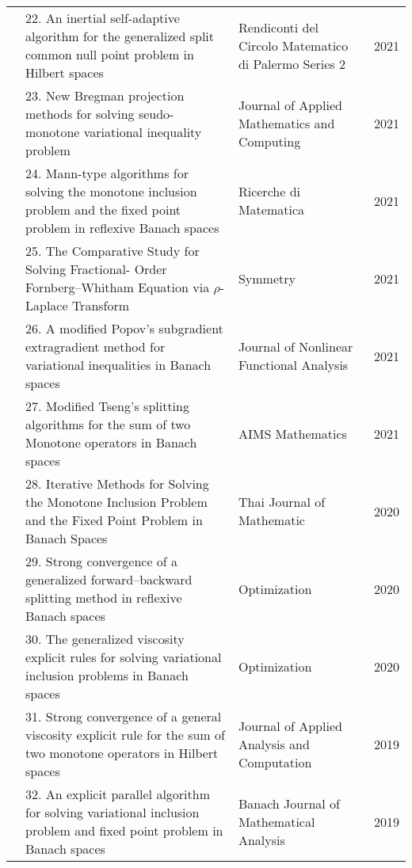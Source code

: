 {\begin{center}
\begin{longtable}{|p{}|p{}|p{}|p{}|}
&22. An inertial self-adaptive
algorithm for the 
generalized split common
null point problem in
Hilbert spaces			
&Rendiconti del
Circolo Matematico
di Palermo Series 2
&2021\\ \cline{2-4}	

&23. New Bregman \newline projection
methods for solving 
seudo-monotone
variational inequality
problem
&Journal of Applied Mathematics 
and Computing
&2021 \\ \cline{2-4}
	
&24. Mann-type algorithms for 
solving the monotone 
inclusion problem and 
the fixed point problem 
in reflexive Banach spaces
&Ricerche di Matematica
&2021\\ \cline{2-4}

&25. The Comparative Study
for Solving Fractional-
Order Fornberg–Whitham 
Equation via $\rho$-Laplace
Transform		
&Symmetry
&2021\\ \cline{2-4}

&26. A modified Popov’s
subgradient extragradient 
method for variational 
inequalities in Banach 
spaces	 
&Journal of
Nonlinear Functional 
Analysis
&2021
\\ \cline{2-4}

&27. Modified Tseng’s 
splitting algorithms for
the sum of two 
Monotone operators 
in Banach spaces
&AIMS Mathematics
&2021 
\\ \cline{2-4}

&28. Iterative Methods for Solving the Monotone
Inclusion Problem and the Fixed Point Problem
in Banach Spaces
&Thai Journal of 
Mathematic
&2020 
\\ \cline{2-4}		

&29. Strong convergence of a generalized forward–backward splitting
method in reflexive Banach spaces				
&Optimization
&2020 
\\ \cline{2-4}	

&30. The generalized viscosity explicit rules for solving variational inclusion
problems in Banach spaces
&Optimization
&2020 \\ \cline{2-4}
&31. Strong convergence of a general viscosity explicit
rule for the sum of two monotone operators in Hilbert spaces
&Journal of Applied Analysis and Computation
&2019 
\\ \cline{2-4}

&32. An explicit parallel 
algorithm for solving 
variational inclusion 
problem and fixed point 
problem in Banach spaces
&Banach Journal 
of Mathematical 
Analysis 
&2019 \\ \cline{2-4}
	

\end{longtable}
\end{center}}
